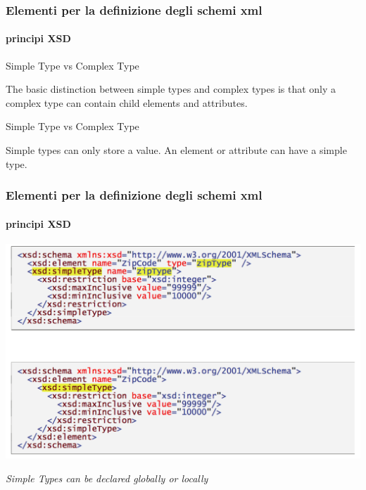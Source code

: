 \begin{frame}
	\frametitle{Elementi per la definizione degli schemi xml}
	\framesubtitle{principi XSD}
	\addtocounter{nframe}{1}

	\begin{block}{Simple Type vs Complex Type}

		The basic distinction between simple types and complex types is that only a complex type can contain child elements and attributes.

	\end{block}

	\begin{block}{Simple Type vs Complex Type}

		Simple types can only store a value. An element or attribute can have a simple type.

	\end{block}

\end{frame}



\begin{frame}
	\frametitle{Elementi per la definizione degli schemi xml}
	\framesubtitle{principi XSD}
	\addtocounter{nframe}{1}

	\begin{center}
		\includegraphics[width=.95\textwidth]{imgs/SimpleTypeGlobalLocal.png}
	\end{center}

	\textit{Simple Types can be declared globally or locally}

\end{frame}



